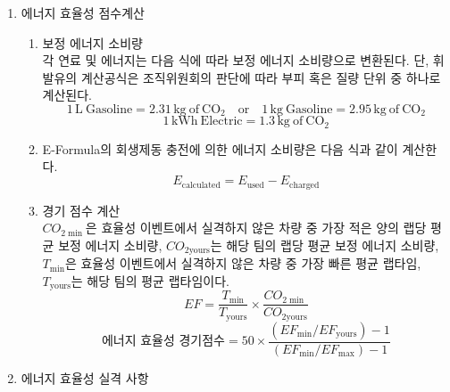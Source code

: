 \documentclass[final,a4paper,10pt]{report}
\begin{document}
{\begin{enumerate}
\begin{enumerate}
      \item\label{rule:formula-competition.energy-efficiency.procedure-e-formula.energy-meter-violation-penalty} 차량기술규정 에너지미터 관련 규정 위반 시 해당 규정에 의해 패널티가 적용된다.
      \item\label{rule:formula-competition.energy-efficiency.procedure-e-formula.net-regen-full-score} 회생 제동 에너지가 사용 에너지를 초과하는 경우 해당 차량은 에너지 효율성 점수에 만점을 부여한다.
    \end{enumerate}
  \item\label{rule:formula-competition.energy-efficiency.scoring} 에너지 효율성 점수계산
    \begin{enumerate}
      \item\label{rule:formula-competition.energy-efficiency.scoring.co2-conversion-factors} 보정 에너지 소비량\\
        각 연료 및 에너지는 다음 식에 따라 보정 에너지 소비량으로 변환된다. 단, 휘발유의 계산공식은 조직위원회의 판단에 따라 부피 혹은 질량 단위 중 하나로 계산된다.
        \[
          1\,\mathrm{L\ Gasoline} = 2.31\,\mathrm{kg\ of\ CO_2}
          \quad\text{or}\quad
          1\,\mathrm{kg\ Gasoline} = 2.95\,\mathrm{kg\ of\ CO_2}
        \]
        \[
          1\,\mathrm{kWh\ Electric} = 1.3\,\mathrm{kg\ of\ CO_2}
        \]
      \item\label{rule:formula-competition.energy-efficiency.scoring.e-formula-net-consumption} E-Formula의 회생제동 충전에 의한 에너지 소비량은 다음 식과 같이 계산한다.
        \[
          E_{\mathrm{calculated}} = E_{\mathrm{used}} - E_{\mathrm{charged}}
        \]
      \item\label{rule:formula-competition.energy-efficiency.scoring.efficiency-score-formula} 경기 점수 계산\\
        $CO_{2\min}$은 효율성 이벤트에서 실격하지 않은 차량 중 가장 적은 양의 랩당 평균 보정 에너지 소비량, $CO_{2\mathrm{yours}}$는 해당 팀의 랩당 평균 보정 에너지 소비량, $T_{\min}$은 효율성 이벤트에서 실격하지 않은 차량 중 가장 빠른 평균 랩타임, $T_{\mathrm{yours}}$는 해당 팀의 평균 랩타임이다.
        \[
          EF = \frac{T_{\min}}{T_{\mathrm{yours}}}
               \times \frac{CO_{2\min}}{CO_{2\mathrm{yours}}}
        \]
        \[
          \text{에너지 효율성 경기점수} = 50 \times
          \frac{(EF_{\min}/EF_{\mathrm{yours}})-1}
               {(EF_{\min}/EF_{\max})-1}
        \]
    \end{enumerate}
  \item\label{rule:formula-competition.energy-efficiency.disqualification-grounds} 에너지 효율성 실격 사항

\end{enumerate}}
\end{document}

